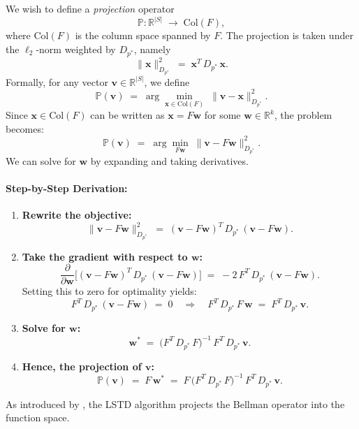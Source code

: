 We wish to define a \emph{projection} operator
\[
\mathbb{P}: \mathbb{R}^{|S|} \;\to\; \text{Col}(F),
\]
where $\text{Col}(F)$ is the column space spanned by $F$. The projection is taken under the $\ell_2$-norm weighted by $D_{p^*}$, namely
\[
\|\boldsymbol{x}\|_{D_{p^*}}^2 \;=\; \boldsymbol{x}^T\,D_{p^*}\,\boldsymbol{x}.
\]
Formally, for any vector $\boldsymbol{v} \in \mathbb{R}^{|S|}$, we define
\[
\mathbb{P}(\boldsymbol{v}) \;=\; \arg\min_{\boldsymbol{x} \in \text{Col}(F)} \;\|\boldsymbol{v} - \boldsymbol{x}\|_{D_{p^*}}^2.
\]
Since $\boldsymbol{x} \in \text{Col}(F)$ can be written as $\boldsymbol{x} = F\boldsymbol{w}$ for some $\boldsymbol{w} \in \mathbb{R}^k$, the problem becomes:
\[
\mathbb{P}(\boldsymbol{v}) 
\;=\; \arg\min_{F\boldsymbol{w}} \;\|\boldsymbol{v} - F\boldsymbol{w}\|_{D_{p^*}}^2.
\]
We can solve for $\boldsymbol{w}$ by expanding and taking derivatives.

\paragraph{Step-by-Step Derivation:}

\begin{enumerate}
    \item \textbf{Rewrite the objective:}
    \[
    \|\boldsymbol{v} - F\boldsymbol{w}\|_{D_{p^*}}^2 
    \;=\; (\boldsymbol{v} - F\boldsymbol{w})^T\,D_{p^*}\,(\boldsymbol{v} - F\boldsymbol{w}).
    \]
    
    \item \textbf{Take the gradient with respect to $\boldsymbol{w}$:}
    \[
    \frac{\partial}{\partial \boldsymbol{w}} 
    \bigl[(\boldsymbol{v} - F\boldsymbol{w})^T\,D_{p^*}\,(\boldsymbol{v} - F\boldsymbol{w})\bigr]
    \;=\;
    -2\,F^T\,D_{p^*}\,(\boldsymbol{v} - F\boldsymbol{w}).
    \]
    Setting this to zero for optimality yields:
    \[
    F^T\,D_{p^*}\,(\boldsymbol{v} - F\boldsymbol{w}) \;=\; 0 
    \quad\Longrightarrow\quad
    F^T\,D_{p^*}\,F\,\boldsymbol{w} \;=\; F^T\,D_{p^*}\,\boldsymbol{v}.
    \]
    
    \item \textbf{Solve for $\boldsymbol{w}$:}
    \[
    \boldsymbol{w}^* 
    \;=\; \bigl(F^T\,D_{p^*}\,F\bigr)^{-1}\,F^T\,D_{p^*}\,\boldsymbol{v}.
    \]
    
    \item \textbf{Hence, the projection of $\boldsymbol{v}$:}
    \[
    \mathbb{P}(\boldsymbol{v})
    \;=\; F\,\boldsymbol{w}^*
    \;=\; F\,\bigl(F^T\,D_{p^*}\,F\bigr)^{-1}\,F^T\,D_{p^*}\,\boldsymbol{v}.
    \]
\end{enumerate}
As introduced by \cite{bradtke1996least}, the LSTD algorithm projects the Bellman operator into the function space.

